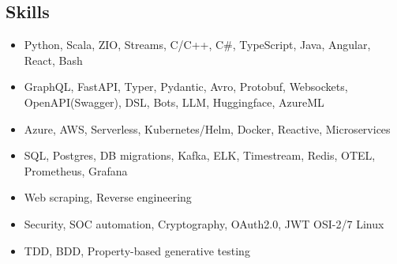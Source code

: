 \subsection*{Skills}

\begin{itemize}[noitemsep, nosep]
  \item Python, Scala, ZIO, Streams, C/C++, C\#, TypeScript, Java, Angular, React, Bash
  \item GraphQL, FastAPI, Typer, Pydantic, Avro, Protobuf, Websockets, OpenAPI(Swagger), DSL, Bots, LLM, Huggingface, AzureML
  \item Azure, AWS, Serverless, Kubernetes/Helm, Docker, Reactive, Microservices
  \item SQL, Postgres, DB migrations, Kafka, ELK, Timestream, Redis, OTEL, Prometheus, Grafana
  \item Web scraping, Reverse engineering
  \item Security, SOC automation, Cryptography, OAuth2.0, JWT \textbar{} OSI-2/7 \textbar{} Linux
  \item TDD, BDD, Property-based generative testing
\end{itemize}
